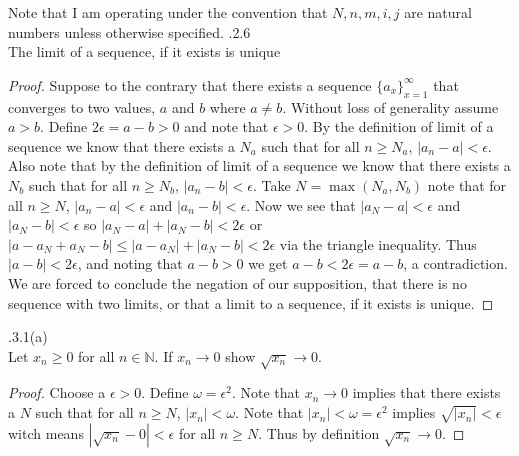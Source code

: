 \documentclass[12pt]{article}
\makeatletter
\theoremstyle{homework}
\newenvironment{exercise}[1]
{\def\@currentlabel{#1}\exercisecore}
{\endexercisecore}
\makeatother
\begin{document}
Note that I am operating under the convention that $N,n,m,i,j$ are natural numbers unless otherwise specified.
\begin{exercise}

2.2.6\\
The limit of a sequence, if it exists is unique
\end{exercise}
\begin{proof}
Suppose to the contrary that there exists a sequence $\{a_x\}^\infty_{x=1}$ that converges to two values, $a$ and $b$ where $a\neq b$.  Without loss of generality assume $a>b$.  Define $2\epsilon=a-b>0$ and note that $\epsilon>0$.  By the definition of limit of a sequence we know that there exists a $N_a$ such that for all $n\geq N_a$, $|a_n-a|<\epsilon$.  Also note that by the definition of limit of a sequence we know that there exists a $N_b$ such that for all $n\geq N_b$, $|a_n-b|<\epsilon$.  Take $N=\max(N_a,N_b)$ note that for all $n\geq N$, $|a_n-a|<\epsilon$ and $|a_n-b|<\epsilon$.  Now we see that $|a_N-a|<\epsilon$ and $|a_N-b|<\epsilon$ so $|a_N-a|+|a_N-b|<2\epsilon$ or $|a-a_N+a_N-b|\leq |a-a_N|+|a_N-b|<2\epsilon$ via the triangle inequality.  Thus $|a-b|<2\epsilon$, and noting that $a-b>0$ we get $a-b<2\epsilon=a-b$, a contradiction.  We are forced to conclude the negation of our supposition, that there is no sequence with two limits, or that a limit to a sequence, if it exists is unique.
\end{proof}

\begin{exercise}

2.3.1(a)\\
Let $x_n\geq 0$ for all $n\in\mathbb{N}$.  If $x_n\rightarrow0$ show $\sqrt{x_n}\rightarrow0$.
\end{exercise}
\begin{proof}
Choose a $\epsilon>0$.  Define $\omega=\epsilon^2$.  Note that $x_n\rightarrow0$ implies that there exists a $N$ such that for all $n\geq N$, $|x_n|<\omega$.  Note that $|x_n|<\omega=\epsilon^2$ implies $\sqrt{|x_n|}<\epsilon$ witch means $|\sqrt{x_n}-0|<\epsilon$ for all $n\geq N$.  Thus by definition $\sqrt{x_n}\rightarrow0$.
\end{proof}
\end{document}
